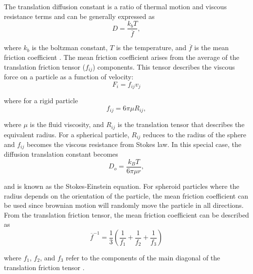 \par The translation diffusion constant is a ratio of thermal motion and viscous resistance terms and can be generally expressed as 
\begin{equation}
    D = \frac{k_bT}{\overline{f}},
\end{equation}

\noindent where $k_b$ is the boltzman constant, $T$ is the temperature, and $\overline{f}$ is the mean friction coefficient \cite{probstein_physicochemical_2005}. The mean friction coefficient arises from the average of the translation friction tensor ($f_{ij}$) components. This tensor describes the viscous force on a particle as a function of velocity:
\begin{equation}
    F_i = f_{ij}v_j
\end{equation}

\noindent where for a rigid particle
\begin{equation}
    f_{ij} = 6\pi \mu R_{ij},
\end{equation}

\noindent where $\mu$ is the fluid viscosity, and $R_{ij}$ is the translation tensor that describes the equivalent radius. For a spherical particle, $R_{ij}$ reduces to the radius of the sphere and $f_{ij}$ becomes the viscous resistance from Stokes law. In this special case, the diffusion translation constant becomes
\begin{equation}
    D_o = \frac{k_BT}{6 \pi \mu r},
\end{equation}

and is known as the Stokes-Einstein equation. For spheroid particles where the radius depends on the orientation of the particle, the mean friction coefficient can be used since brownian motion will randomly move the particle in all directions. From the translation friction tensor, the mean friction coefficient can be described as 
\begin{equation}
    \overline{f}^{-1} = \frac{1}{3}(\frac{1}{f_1} + \frac{1}{f_2} + \frac{1}{f_3})
\end{equation}

\noindent where $f_1$, $f_2$, and $f_3$ refer to the components of the main diagonal of the translation friction tensor \cite{probstein_physicochemical_2005}. 

